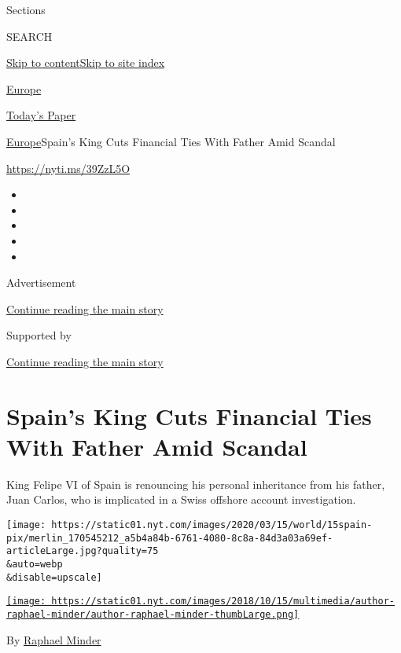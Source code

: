 Sections

SEARCH

\protect\hyperlink{site-content}{Skip to
content}\protect\hyperlink{site-index}{Skip to site index}

\href{https://www.nytimes.com/section/world/europe}{Europe}

\href{https://myaccount.nytimes.com/auth/login?response_type=cookie\&client_id=vi}{}

\href{https://www.nytimes.com/section/todayspaper}{Today's Paper}

\href{/section/world/europe}{Europe}\textbar{}Spain's King Cuts
Financial Ties With Father Amid Scandal

\url{https://nyti.ms/39ZzL5O}

\begin{itemize}
\item
\item
\item
\item
\item
\end{itemize}

Advertisement

\protect\hyperlink{after-top}{Continue reading the main story}

Supported by

\protect\hyperlink{after-sponsor}{Continue reading the main story}

\hypertarget{spains-king-cuts-financial-ties-with-father-amid-scandal}{%
\section{Spain's King Cuts Financial Ties With Father Amid
Scandal}\label{spains-king-cuts-financial-ties-with-father-amid-scandal}}

King Felipe VI of Spain is renouncing his personal inheritance from his
father, Juan Carlos, who is implicated in a Swiss offshore account
investigation.

\texttt{[image: https://static01.nyt.com/images/2020/03/15/world/15spain-pix/merlin\_170545212\_a5b4a84b-6761-4080-8c8a-84d3a03a69ef-articleLarge.jpg?quality=75\\\&auto=webp\\\&disable=upscale]}

\href{https://www.nytimes.com/by/raphael-minder}{\texttt{[image: https://static01.nyt.com/images/2018/10/15/multimedia/author-raphael-minder/author-raphael-minder-thumbLarge.png]}}

By \href{https://www.nytimes.com/by/raphael-minder}{Raphael Minder}

